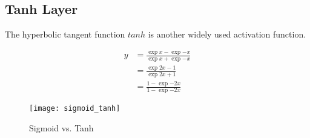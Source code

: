\subsection{Tanh Layer}

The hyperbolic tangent function $tanh$ is another widely used activation function.

\begin{equation} \label{eq:tanh}
  \begin{split}
    y & = \frac{\exp{x} - \exp{-x}}{\exp{x} + \exp{-x}} \\
      & = \frac{\exp{2x} - 1}{\exp{2x} + 1} \\
      & = \frac{1- \exp{-2x}}{1 - \exp{-2x}}
  \end{split}
\end{equation}

\begin{figure}[h]
  \centering
  \texttt{[image: sigmoid\_tanh]}
  \caption{Sigmoid vs. Tanh}
  \label{fig:sigmoid_tanh}
\end{figure}

\clearpage %
